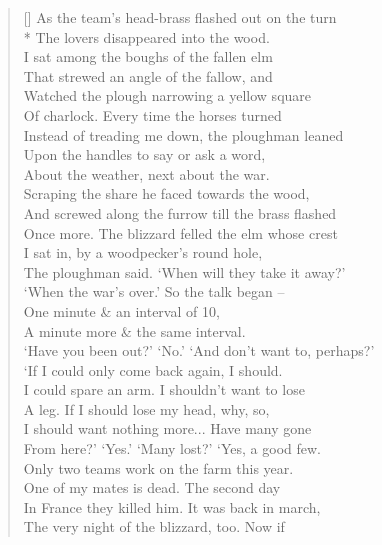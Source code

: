 \documentclass[MAIN]{subfiles}
\begin{document}
\settowidth{\versewidth}{As the team's head-brass flashed out on the turn}
\begin{verse}[\versewidth]
As the team's head-brass flashed out on the turn\\*
The lovers disappeared into the wood.\\
I sat among the boughs of the fallen elm\\
That strewed an angle of the fallow, and\\
Watched the plough narrowing a yellow square\\
Of charlock. Every time the horses turned\\
Instead of treading me down, the ploughman leaned\\
Upon the handles to say or ask a word,\\
About the weather, next about the war.\\
Scraping the share he faced towards the wood,\\
And screwed along the furrow till the brass flashed\\
Once more. The blizzard felled the elm whose crest\\
I sat in, by a woodpecker's round hole,\\
The ploughman said. `When will they take it away?'\\
`When the war's over.' So the talk began --\\
One minute \& an interval of 10,\\
A minute more \& the same interval.\\
`Have you been out?' `No.' `And don’t want to, perhaps?'\\
`If I could only come back again, I should.\\
I could spare an arm. I shouldn't want to lose\\
A leg. If I should lose my head, why, so,\\
I should want nothing more... Have many gone\\
From here?' `Yes.' `Many lost?' `Yes, a good few.\\
Only two teams work on the farm this year.\\
One of my mates is dead. The second day\\
In France they killed him. It was back in march,\\
The very night of the blizzard, too. Now if\\

\end{verse}
\end{document}
